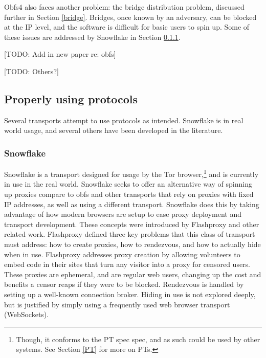 \documentclass[12pt]{report}
\begin{document}
Obfs4 also faces another problem: the bridge distribution problem, discussed further in Section \ref{bridge}. Bridges, once known by an adversary, can be blocked at the IP level, and the software is difficult for basic users to spin up. Some of these issues are addressed by Snowflake in Section \ref{snowflake}.

[TODO: Add in new paper re: obfs]

[TODO: Others?]

\subsection{Properly using protocols}

Several transports attempt to use protocols as intended. Snowflake is in real world usage, and several others have been developed in the literature.

\subsubsection{Snowflake}
\label{snowflake}

Snowflake is a transport designed for usage by the Tor browser,\footnote{Though, it conforms to the PT spec spec, and as such could be used by other systems. See Section \ref{PT} for more on PTs.} and is currently in use in the real world. Snowflake seeks to offer an alternative way of spinning up proxies compare to obfs and other transports that rely on proxies with fixed IP addresses, as well as using a different transport. Snowflake does this by taking advantage of how modern browsers are setup to ease proxy deployment and transport development. These concepts were introduced by Flashproxy and other related work. Flashproxy defined three key problems that this class of transport must address: how to create proxies, how to rendezvous, and how to actually hide when in use.\cite{flashproxy} Flashproxy addresses proxy creation by allowing volunteers to embed code in their sites that turn any visitor into a proxy for censored users. These proxies are ephemeral, and are regular web users, changing up the cost and benefits a censor reaps if they were to be blocked. Rendezvous is handled by setting up a well-known connection broker. Hiding in use is not explored deeply, but is justified by simply using a frequently used web browser transport (WebSockets).
\end{document}
